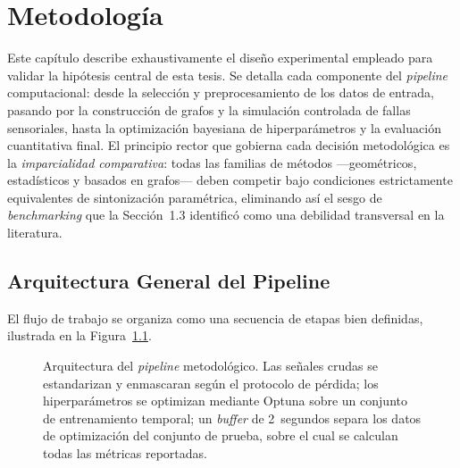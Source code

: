 \chapter{Metodología}

Este capítulo describe exhaustivamente el diseño experimental empleado para validar la hipótesis central de esta tesis. Se detalla cada componente del \textit{pipeline} computacional: desde la selección y preprocesamiento de los datos de entrada, pasando por la construcción de grafos y la simulación controlada de fallas sensoriales, hasta la optimización bayesiana de hiperparámetros y la evaluación cuantitativa final. El principio rector que gobierna cada decisión metodológica es la \textit{imparcialidad comparativa}: todas las familias de métodos —geométricos, estadísticos y basados en grafos— deben competir bajo condiciones estrictamente equivalentes de sintonización paramétrica, eliminando así el sesgo de \textit{benchmarking} que la Sección~1.3 identificó como una debilidad transversal en la literatura.

\section{Arquitectura General del Pipeline}

El flujo de trabajo se organiza como una secuencia de etapas bien definidas, ilustrada en la Figura~\ref{fig:methodology_pipeline}.

\begin{figure}[ht]
    \centering
    \caption{Arquitectura del \textit{pipeline} metodológico. Las señales crudas se estandarizan y enmascaran según el protocolo de pérdida; los hiperparámetros se optimizan mediante Optuna sobre un conjunto de entrenamiento temporal; un \textit{buffer} de 2~segundos separa los datos de optimización del conjunto de prueba, sobre el cual se calculan todas las métricas reportadas.}
    \label{fig:methodology_pipeline}
\end{figure}


